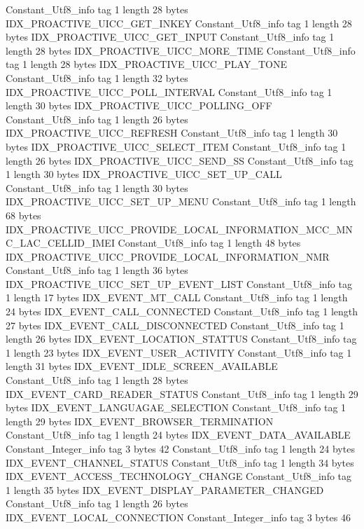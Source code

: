 {{{		}
		Constant_Utf8_info {
			tag	1
			length	28
			bytes	IDX_PROACTIVE_UICC_GET_INKEY
		}
		Constant_Utf8_info {
			tag	1
			length	28
			bytes	IDX_PROACTIVE_UICC_GET_INPUT
		}
		Constant_Utf8_info {
			tag	1
			length	28
			bytes	IDX_PROACTIVE_UICC_MORE_TIME
		}
		Constant_Utf8_info {
			tag	1
			length	28
			bytes	IDX_PROACTIVE_UICC_PLAY_TONE
		}
		Constant_Utf8_info {
			tag	1
			length	32
			bytes	IDX_PROACTIVE_UICC_POLL_INTERVAL
		}
		Constant_Utf8_info {
			tag	1
			length	30
			bytes	IDX_PROACTIVE_UICC_POLLING_OFF
		}
		Constant_Utf8_info {
			tag	1
			length	26
			bytes	IDX_PROACTIVE_UICC_REFRESH
		}
		Constant_Utf8_info {
			tag	1
			length	30
			bytes	IDX_PROACTIVE_UICC_SELECT_ITEM
		}
		Constant_Utf8_info {
			tag	1
			length	26
			bytes	IDX_PROACTIVE_UICC_SEND_SS
		}
		Constant_Utf8_info {
			tag	1
			length	30
			bytes	IDX_PROACTIVE_UICC_SET_UP_CALL
		}
		Constant_Utf8_info {
			tag	1
			length	30
			bytes	IDX_PROACTIVE_UICC_SET_UP_MENU
		}
		Constant_Utf8_info {
			tag	1
			length	68
			bytes	IDX_PROACTIVE_UICC_PROVIDE_LOCAL_INFORMATION_MCC_MNC_LAC_CELLID_IMEI
		}
		Constant_Utf8_info {
			tag	1
			length	48
			bytes	IDX_PROACTIVE_UICC_PROVIDE_LOCAL_INFORMATION_NMR
		}
		Constant_Utf8_info {
			tag	1
			length	36
			bytes	IDX_PROACTIVE_UICC_SET_UP_EVENT_LIST
		}
		Constant_Utf8_info {
			tag	1
			length	17
			bytes	IDX_EVENT_MT_CALL
		}
		Constant_Utf8_info {
			tag	1
			length	24
			bytes	IDX_EVENT_CALL_CONNECTED
		}
		Constant_Utf8_info {
			tag	1
			length	27
			bytes	IDX_EVENT_CALL_DISCONNECTED
		}
		Constant_Utf8_info {
			tag	1
			length	26
			bytes	IDX_EVENT_LOCATION_STATTUS
		}
		Constant_Utf8_info {
			tag	1
			length	23
			bytes	IDX_EVENT_USER_ACTIVITY
		}
		Constant_Utf8_info {
			tag	1
			length	31
			bytes	IDX_EVENT_IDLE_SCREEN_AVAILABLE
		}
		Constant_Utf8_info {
			tag	1
			length	28
			bytes	IDX_EVENT_CARD_READER_STATUS
		}
		Constant_Utf8_info {
			tag	1
			length	29
			bytes	IDX_EVENT_LANGUAGAE_SELECTION
		}
		Constant_Utf8_info {
			tag	1
			length	29
			bytes	IDX_EVENT_BROWSER_TERMINATION
		}
		Constant_Utf8_info {
			tag	1
			length	24
			bytes	IDX_EVENT_DATA_AVAILABLE
		}
		Constant_Integer_info {
			tag	3
			bytes	42
		}
		Constant_Utf8_info {
			tag	1
			length	24
			bytes	IDX_EVENT_CHANNEL_STATUS
		}
		Constant_Utf8_info {
			tag	1
			length	34
			bytes	IDX_EVENT_ACCESS_TECHNOLOGY_CHANGE
		}
		Constant_Utf8_info {
			tag	1
			length	35
			bytes	IDX_EVENT_DISPLAY_PARAMETER_CHANGED
		}
		Constant_Utf8_info {
			tag	1
			length	26
			bytes	IDX_EVENT_LOCAL_CONNECTION
		}
		Constant_Integer_info {
			tag	3
			bytes	46
		}
}}

